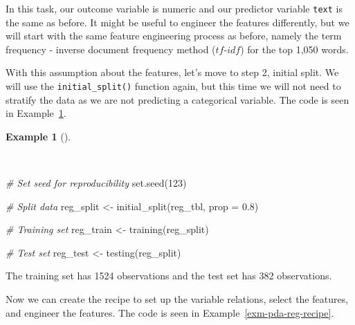 \documentclass[
  letterpaper,
]{latex/krantz}
\newenvironment{Shaded}{\begin{snugshade}}{\end{snugshade}}
\newcommand{\AttributeTok}[1]{\textcolor[rgb]{0.00,0.00,0.00}{#1}}
\newcommand{\CommentTok}[1]{\textcolor[rgb]{0.00,0.00,0.00}{\textit{#1}}}
\newcommand{\DecValTok}[1]{\textcolor[rgb]{0.00,0.00,0.00}{#1}}
\newcommand{\FloatTok}[1]{\textcolor[rgb]{0.00,0.00,0.00}{#1}}
\newcommand{\FunctionTok}[1]{\textcolor[rgb]{0.00,0.00,0.00}{#1}}
\newcommand{\NormalTok}[1]{\textcolor[rgb]{0.00,0.00,0.00}{#1}}
\newcommand{\OtherTok}[1]{\textcolor[rgb]{0.00,0.00,0.00}{#1}}
\theoremstyle{definition}
\newtheorem{example}{Example}[chapter]
\theoremstyle{remark}
\begin{document}
In this task, our outcome variable is numeric and our predictor variable
\texttt{text} is the same as before. It might be useful to engineer the
features differently, but we will start with the same feature
engineering process as before, namely the term frequency - inverse
document frequency method (\(tf\)-\(idf\)) for the top 1,050 words.

With this assumption about the features, let's move to step 2, initial
split. We will use the \texttt{initial\_split()} function again, but
this time we will not need to stratify the data as we are not predicting
a categorical variable. The code is seen in
Example~\ref{exm-pda-reg-initial-split}.

\begin{example}[]\protect\hypertarget{exm-pda-reg-initial-split}{}\label{exm-pda-reg-initial-split}

~

\begin{Shaded}
\begin{Highlighting}[]
\CommentTok{\# Set seed for reproducibility}
\FunctionTok{set.seed}\NormalTok{(}\DecValTok{123}\NormalTok{)}

\CommentTok{\# Split data}
\NormalTok{reg\_split }\OtherTok{\textless{}{-}}
  \FunctionTok{initial\_split}\NormalTok{(reg\_tbl, }\AttributeTok{prop =} \FloatTok{0.8}\NormalTok{)}

\CommentTok{\# Training set}
\NormalTok{reg\_train }\OtherTok{\textless{}{-}}
  \FunctionTok{training}\NormalTok{(reg\_split)}

\CommentTok{\# Test set}
\NormalTok{reg\_test }\OtherTok{\textless{}{-}}
  \FunctionTok{testing}\NormalTok{(reg\_split)}
\end{Highlighting}
\end{Shaded}

\end{example}

The training set has 1524 observations and the test set has 382
observations.

Now we can create the recipe to set up the variable relations, select
the features, and engineer the features. The code is seen in
Example~\ref{exm-pda-reg-recipe}.
\end{document}
